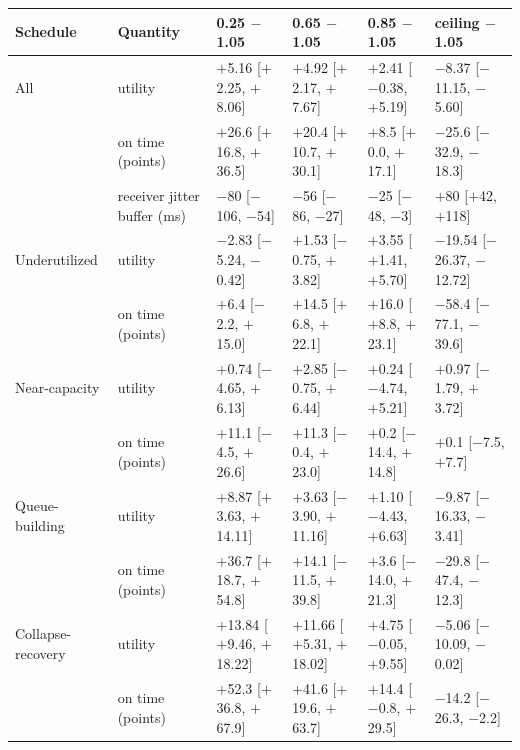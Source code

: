\begin{tabular}{llllll}
\toprule
Schedule & Quantity & 0.25 $-$ 1.05 & 0.65 $-$ 1.05 & 0.85 $-$ 1.05 & ceiling $-$ 1.05 \\
\midrule
All & utility & $+$5.16 [$+$2.25, $+$8.06] & $+$4.92 [$+$2.17, $+$7.67] & $+$2.41 [$-$0.38, $+$5.19] & $-$8.37 [$-$11.15, $-$5.60] \\
 & on time (points) & $+$26.6 [$+$16.8, $+$36.5] & $+$20.4 [$+$10.7, $+$30.1] & $+$8.5 [$+$0.0, $+$17.1] & $-$25.6 [$-$32.9, $-$18.3] \\
 & receiver jitter buffer (ms) & $-$80 [$-$106, $-$54] & $-$56 [$-$86, $-$27] & $-$25 [$-$48, $-$3] & $+$80 [$+$42, $+$118] \\
\midrule
Underutilized & utility & $-$2.83 [$-$5.24, $-$0.42] & $+$1.53 [$-$0.75, $+$3.82] & $+$3.55 [$+$1.41, $+$5.70] & $-$19.54 [$-$26.37, $-$12.72] \\
 & on time (points) & $+$6.4 [$-$2.2, $+$15.0] & $+$14.5 [$+$6.8, $+$22.1] & $+$16.0 [$+$8.8, $+$23.1] & $-$58.4 [$-$77.1, $-$39.6] \\
Near-capacity & utility & $+$0.74 [$-$4.65, $+$6.13] & $+$2.85 [$-$0.75, $+$6.44] & $+$0.24 [$-$4.74, $+$5.21] & $+$0.97 [$-$1.79, $+$3.72] \\
 & on time (points) & $+$11.1 [$-$4.5, $+$26.6] & $+$11.3 [$-$0.4, $+$23.0] & $+$0.2 [$-$14.4, $+$14.8] & $+$0.1 [$-$7.5, $+$7.7] \\
Queue-building & utility & $+$8.87 [$+$3.63, $+$14.11] & $+$3.63 [$-$3.90, $+$11.16] & $+$1.10 [$-$4.43, $+$6.63] & $-$9.87 [$-$16.33, $-$3.41] \\
 & on time (points) & $+$36.7 [$+$18.7, $+$54.8] & $+$14.1 [$-$11.5, $+$39.8] & $+$3.6 [$-$14.0, $+$21.3] & $-$29.8 [$-$47.4, $-$12.3] \\
Collapse-recovery & utility & $+$13.84 [$+$9.46, $+$18.22] & $+$11.66 [$+$5.31, $+$18.02] & $+$4.75 [$-$0.05, $+$9.55] & $-$5.06 [$-$10.09, $-$0.02] \\
 & on time (points) & $+$52.3 [$+$36.8, $+$67.9] & $+$41.6 [$+$19.6, $+$63.7] & $+$14.4 [$-$0.8, $+$29.5] & $-$14.2 [$-$26.3, $-$2.2] \\
\bottomrule
\end{tabular}
